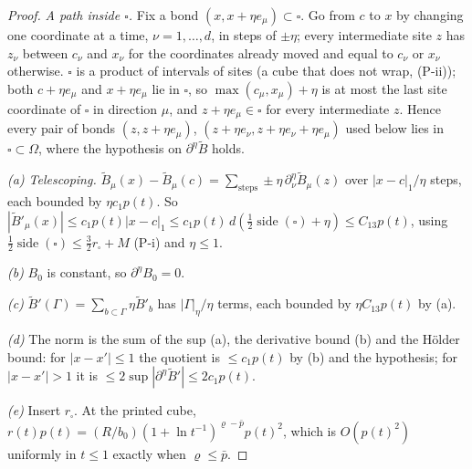 \begin{proof}
\emph{A path inside $\square$.} Fix a bond $(x,x+\eta e_\mu)\subset\square$. Go from $c$ to $x$ by changing one coordinate at a time, $\nu=1,\dots,d$, in steps of $\pm\eta$; every intermediate site $z$ has $z_\nu$ between $c_\nu$ and $x_\nu$ for the coordinates already moved and equal to $c_\nu$ or $x_\nu$ otherwise. $\square$ is a product of intervals of sites (a cube that does not wrap, (P-ii)); both $c+\eta e_\mu$ and $x+\eta e_\mu$ lie in $\square$, so $\max(c_\mu,x_\mu)+\eta$ is at most the last site coordinate of $\square$ in direction $\mu$, and $z+\eta e_\mu\in\square$ for every intermediate $z$. Hence every pair of bonds $(z,z+\eta e_\mu)$, $(z+\eta e_\nu,z+\eta e_\nu+\eta e_\mu)$ used below lies in $\square\subset\Omega$, where the hypothesis on $\partial^\eta\tilde B$ holds.

\emph{(a) Telescoping.} $\tilde B_\mu(x)-\tilde B_\mu(c)=\sum_{\text{steps}}\pm\eta\,\partial^\eta_\nu\tilde B_\mu(z)$ over $|x-c|_1/\eta$ steps, each bounded by $\eta c_1p(t)$. So $|\tilde B'_\mu(x)|\le c_1p(t)|x-c|_1\le c_1p(t)\,d(\tfrac12\operatorname{side}(\square)+\eta)\le C_{13}p(t)$, using $\tfrac12\operatorname{side}(\square)\le\tfrac32r_\square+M$ (P-i) and $\eta\le1$.

\emph{(b)} $B_0$ is constant, so $\partial^\eta B_0=0$.

\emph{(c)} $\tilde B'(\Gamma)=\sum_{b\subset\Gamma}\eta\tilde B'_b$ has $|\Gamma|_\eta/\eta$ terms, each bounded by $\eta C_{13}p(t)$ by (a).

\emph{(d)} The norm is the sum of the sup (a), the derivative bound (b) and the H\"older bound: for $|x-x'|\le1$ the quotient is $\le c_1p(t)$ by (b) and the hypothesis; for $|x-x'|>1$ it is $\le2\sup|\partial^\eta\tilde B'|\le2c_1p(t)$.

\emph{(e)} Insert $r_\square$. At the printed cube, $r(t)p(t)=(R/b_0)(1+\ln t^{-1})^{\varrho-\bar p}p(t)^2$, which is $O(p(t)^2)$ uniformly in $t\le1$ exactly when $\varrho\le\bar p$.
\end{proof}


